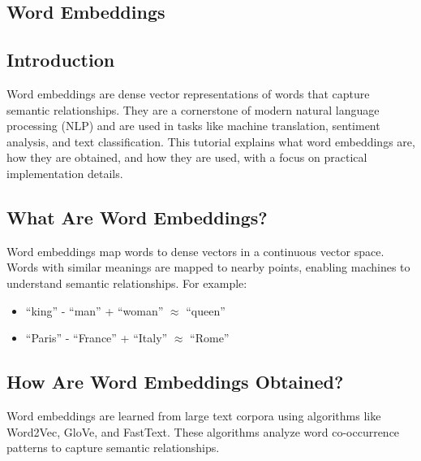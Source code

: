 \begin{notechapter}
\lstset{style=mystyle}
\chapter{Word Embeddings}\label{ch:word-embeddings}

\section{Introduction}
Word embeddings are dense vector representations of words that 
capture semantic relationships. They are a cornerstone of modern 
natural language processing (NLP) and are used in tasks like 
machine translation, sentiment analysis, and text classification. 
This tutorial explains what word embeddings are, how they are 
obtained, and how they are used, with a focus on practical 
implementation details.

\section{What Are Word Embeddings?}
Word embeddings map words to dense vectors in a continuous vector 
space. Words with similar meanings are mapped to nearby points, 
enabling machines to understand semantic relationships. For 
example:
\begin{itemize}
    \item ``king'' - ``man'' + ``woman'' $\approx$ ``queen''
    \item ``Paris'' - ``France'' + ``Italy'' $\approx$ ``Rome''
\end{itemize}

\section{How Are Word Embeddings Obtained?}
Word embeddings are learned from large text corpora using 
algorithms like Word2Vec, GloVe, and FastText. These algorithms 
analyze word co-occurrence patterns to capture semantic 
relationships.


\end{notechapter}
